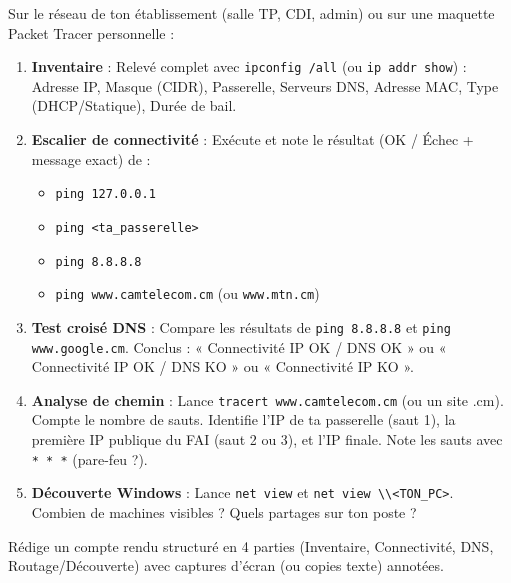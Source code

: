 \documentclass[11pt]{article}
\begin{document}
\begin{exercice}
Sur le réseau de ton établissement (salle TP, CDI, admin) ou sur une maquette Packet Tracer personnelle :
\begin{enumerate}
\item \textbf{Inventaire} : Relevé complet avec \texttt{ipconfig /all} (ou \texttt{ip addr show}) : Adresse IP, Masque (CIDR), Passerelle, Serveurs DNS, Adresse MAC, Type (DHCP/Statique), Durée de bail.
\item \textbf{Escalier de connectivité} : Exécute et note le résultat (OK / Échec + message exact) de :
      \begin{itemize}
      \item \texttt{ping 127.0.0.1}
      \item \texttt{ping <ta\_passerelle>}
      \item \texttt{ping 8.8.8.8}
      \item \texttt{ping www.camtelecom.cm} (ou \texttt{www.mtn.cm})
      \end{itemize}
\item \textbf{Test croisé DNS} : Compare les résultats de \texttt{ping 8.8.8.8} et \texttt{ping www.google.cm}. Conclus : « Connectivité IP OK / DNS OK » ou « Connectivité IP OK / DNS KO » ou « Connectivité IP KO ».
\item \textbf{Analyse de chemin} : Lance \texttt{tracert www.camtelecom.cm} (ou un site .cm). Compte le nombre de sauts. Identifie l'IP de ta passerelle (saut 1), la première IP publique du FAI (saut 2 ou 3), et l'IP finale. Note les sauts avec \texttt{* * *} (pare-feu ?).
\item \textbf{Découverte Windows} : Lance \texttt{net view} et \texttt{net view \textbackslash\textbackslash <TON\_PC>}. Combien de machines visibles ? Quels partages sur ton poste ?
\end{enumerate}
Rédige un compte rendu structuré en 4 parties (Inventaire, Connectivité, DNS, Routage/Découverte) avec captures d'écran (ou copies texte) annotées.
\end{exercice}
\end{document}
